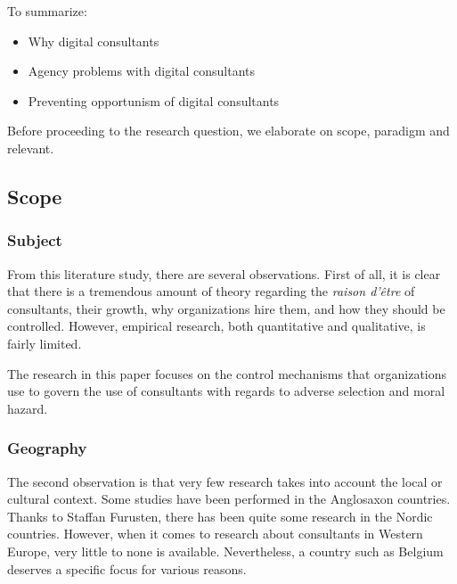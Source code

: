 \documentclass[12pt]{article}
\begin{document}
To summarize:

\begin{itemize}
\item
  Why digital consultants
\item
  Agency problems with digital consultants
\item
  Preventing opportunism of digital consultants
\end{itemize}

Before proceeding to the research question, we elaborate on scope,
paradigm and relevant.

\subsection{Scope}\label{scope}

\subsubsection{Subject}\label{subject}

From this literature study, there are several observations. First of
all, it is clear that there is a tremendous amount of theory regarding
the \emph{raison d'être} of consultants, their growth, why organizations
hire them, and how they should be controlled. However, empirical
research, both quantitative and qualitative, is fairly limited.

The research in this paper focuses on the control mechanisms that
organizations use to govern the use of consultants with regards to
adverse selection and moral hazard.

\subsubsection{Geography}\label{geography}

The second observation is that very few research takes into account the
local or cultural context. Some studies have been performed in the
Anglosaxon countries. Thanks to Staffan Furusten, there has been quite
some research in the Nordic countries. However, when it comes to
research about consultants in Western Europe, very little to none is
available. Nevertheless, a country such as Belgium deserves a specific
focus for various reasons.
\end{document}
